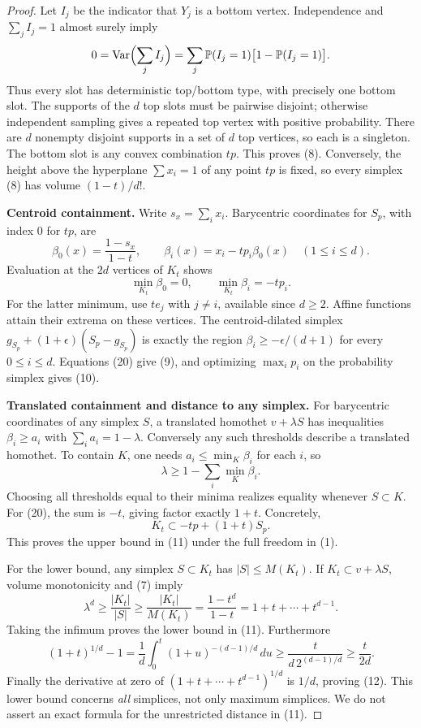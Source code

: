 \begin{proof}
Let $I_j$ be the indicator that $Y_j$ is a bottom vertex. Independence and
$\sum_j I_j=1$ almost surely imply
\[
 0=\operatorname{Var}\Bigl(\sum_j I_j\Bigr)
  =\sum_j \mathbb P(I_j=1)\bigl[1-\mathbb P(I_j=1)\bigr].
\]
Thus every slot has deterministic top/bottom type, with precisely one bottom
slot. The supports of the $d$ top slots must be pairwise disjoint; otherwise
independent sampling gives a repeated top vertex with positive probability.
There are $d$ nonempty disjoint supports in a set of $d$ top vertices, so
each is a singleton. The bottom slot is any convex combination $tp$.
This proves (8). Conversely, the height above the hyperplane
$\sum x_i=1$ of any point $tp$ is fixed, so every simplex (8) has volume
$(1-t)/d!$.

\medskip\noindent\textbf{Centroid containment.}
Write $s_x=\sum_i x_i$. Barycentric coordinates for $S_p$, with index $0$
for $tp$, are
\[
 \beta_0(x)=\frac{1-s_x}{1-t},\qquad
 \beta_i(x)=x_i-tp_i\beta_0(x)\quad(1\le i\le d).
 \tag{19}
\]
Evaluation at the $2d$ vertices of $K_t$ shows
\[
 \min_{K_t}\beta_0=0,\qquad \min_{K_t}\beta_i=-tp_i.
 \tag{20}
\]
For the latter minimum, use $te_j$ with $j\ne i$, available since $d\ge2$.
Affine functions attain their extrema on these vertices.
The centroid-dilated simplex $g_{S_p}+(1+\epsilon)(S_p-g_{S_p})$
is exactly the region $\beta_i\ge-\epsilon/(d+1)$ for every
$0\le i\le d$. Equations (20) give (9), and optimizing $\max_i p_i$
on the probability simplex gives (10).

\medskip\noindent\textbf{Translated containment and distance to any simplex.}
For barycentric coordinates of any simplex $S$, a translated homothet
$v+\lambda S$ has inequalities $\beta_i\ge a_i$ with
$\sum_i a_i=1-\lambda$. Conversely any such thresholds describe a
translated homothet. To contain $K$, one needs
$a_i\le\min_K\beta_i$ for each $i$, so
\[
 \lambda\ge1-\sum_i\min_K\beta_i.
 \tag{21}
\]
Choosing all thresholds equal to their minima realizes equality whenever
$S\subset K$. For (20), the sum is $-t$, giving factor exactly $1+t$.
Concretely,
\[
 K_t\subset -tp+(1+t)S_p.
 \tag{22}
\]
This proves the upper bound in (11) under the full freedom in (1).

For the lower bound, any simplex $S\subset K_t$ has $|S|\le M(K_t)$.
If $K_t\subset v+\lambda S$, volume monotonicity and (7) imply
\[
 \lambda^d\ge\frac{|K_t|}{|S|}
 \ge\frac{|K_t|}{M(K_t)}
 =\frac{1-t^d}{1-t}=1+t+\cdots+t^{d-1}.
 \tag{23}
\]
Taking the infimum proves the lower bound in (11). Furthermore
\[
 (1+t)^{1/d}-1
 =\frac1d\int_0^t(1+u)^{-(d-1)/d}\,du
 \ge\frac{t}{d\,2^{(d-1)/d}}\ge\frac{t}{2d}.
\]
Finally the derivative at zero of
$(1+t+\cdots+t^{d-1})^{1/d}$ is $1/d$, proving (12).
This lower bound concerns \emph{all} simplices, not only maximum simplices.
We do not assert an exact formula for the unrestricted distance in (11).


\end{proof}

